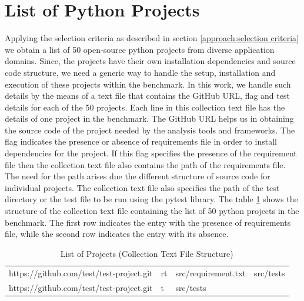 \section{List of Python Projects}
\label{approach:list of projects}
Applying the selection criteria as described in section \ref{approach:selection criteria} we obtain a list of 50 open-source python projects from diverse application domains. Since, the projects have their own installation dependencies and source code structure, we need a generic way to handle the setup, installation and execution of these projects within the benchmark. In this work, we handle such details by the means of a text file that contains the GitHub URL, flag and test details for each of the 50 projects. Each line in this collection text file has the details of one project in the benchmark. The GitHub URL helps us in obtaining the source code of the project needed by the analysis tools and frameworks. The flag indicates the presence or absence of requirements file in order to install dependencies for the project. If this flag specifies the presence of the requirement file then the collection text file also contains the path of the requirements file. The need for the path arises due the different structure of source code for individual projects. The collection text file also specifies the path of the test directory or the test file to be run using the pytest library. The table \ref{table:list of projects} shows the structure of the collection text file containing the list of 50 python projects in the benchmark. The first row indicates the entry with the presence of requirements file, while the second row indicates the entry with its absence.

\begin{table}[ht]
    \centering
    \begin{tabular}{llll}
    \hline
    https://github.com/test/test-project.git    & rt    & src/requirement.txt   & src/tests\\
    https://github.com/test/test-project.git    & t    & src/tests\\
    \hline
    \end{tabular}
    \caption{List of Projects (Collection Text File Structure)}
    \label{table:list of projects}
\end{table}

